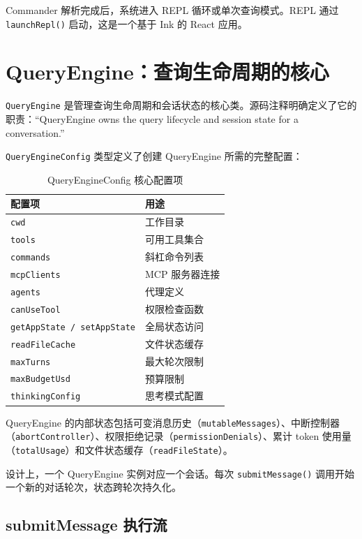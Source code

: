 Commander 解析完成后，系统进入 REPL 循环或单次查询模式。REPL 通过 \texttt{launchRepl()} 启动，这是一个基于 Ink 的 React 应用。

\section{QueryEngine：查询生命周期的核心}

\texttt{QueryEngine} 是管理查询生命周期和会话状态的核心类。源码注释明确定义了它的职责：``QueryEngine owns the query lifecycle and session state for a conversation.''

\texttt{QueryEngineConfig} 类型定义了创建 QueryEngine 所需的完整配置：

\begin{table}[htbp]
\centering
\begin{tabularx}{\textwidth}{lX}
\toprule
\textbf{配置项} & \textbf{用途} \\
\midrule
\texttt{cwd} & 工作目录 \\
\texttt{tools} & 可用工具集合 \\
\texttt{commands} & 斜杠命令列表 \\
\texttt{mcpClients} & MCP 服务器连接 \\
\texttt{agents} & 代理定义 \\
\texttt{canUseTool} & 权限检查函数 \\
\texttt{getAppState / setAppState} & 全局状态访问 \\
\texttt{readFileCache} & 文件状态缓存 \\
\texttt{maxTurns} & 最大轮次限制 \\
\texttt{maxBudgetUsd} & 预算限制 \\
\texttt{thinkingConfig} & 思考模式配置 \\
\bottomrule
\end{tabularx}
\caption{QueryEngineConfig 核心配置项}
\end{table}

QueryEngine 的内部状态包括可变消息历史（\texttt{mutableMessages}）、中断控制器（\texttt{abortController}）、权限拒绝记录（\texttt{permissionDenials}）、累计 token 使用量（\texttt{totalUsage}）和文件状态缓存（\texttt{readFileState}）。

设计上，一个 QueryEngine 实例对应一个会话。每次 \texttt{submitMessage()} 调用开始一个新的对话轮次，状态跨轮次持久化。

\subsection{submitMessage 执行流}

